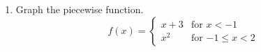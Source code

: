\begin{enumerate}


\newpage



\item Graph the piecewise function.
\[
  f(x) =
  \begin{cases}
                                   x+3 & \text{for $x<-1$} \\
                                   x^2 & \text{for $-1 \leq x <2$} 
  \end{cases}
\]



\end{enumerate}
